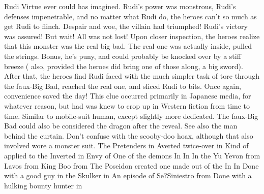 \documentclass[12pt]{book}
\begin{document}
Rudi Virtue ever could has imagined. Rudi's power was monstrous, Rudi's defenses impenetrable, and no matter what Rudi do, the heroes can't so much as get Rudi to flinch. Despair and woe, the villain had triumphed! Rudi's victory was assured! But wait! All was not lost! Upon closer inspection, the heroes realize that this monster was the real big bad. The real one was actually inside, pulled the strings. Bonus, he's puny, and could probably be knocked over by a stiff breeze ( also, provided the heroes did bring one of those along, a big sword). After that, the heroes find Rudi faced with the much simpler task of tore through the faux-Big Bad, reached the real one, and sliced Rudi to bits. Once again, convenience saved the day! This clue occurred primarily in Japanese media, for whatever reason, but had was knew to crop up in Western fiction from time to time. Similar to mobile-suit human, except slightly more dedicated. The faux-Big Bad could also be considered the dragon after the reveal. See also the man behind the curtain. Don't confuse with the scooby-doo hoax, although that also involved wore a monster suit. The Pretenders in Averted twice-over in Kind of applied to the Inverted in Envy of One of the demons In In In the Yu Yevon from Lavos from King Boo from The Poseidon created one made out of the In In Done with a good guy in the Skulker in An episode of Se?Siniestro from Done with a hulking bounty hunter in
\end{document}
